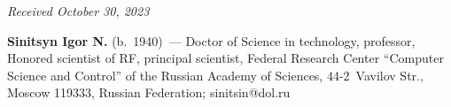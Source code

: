 \vspace*{-6pt}

\hfill{\small\textit{Received October 30, 2023}} 

\vspace*{-18pt}

\Contrl

\vspace*{-3pt}

\noindent 
\textbf{Sinitsyn Igor N.} (b.\ 1940)~--- 
Doctor of Science in technology, professor, Honored scientist of RF, principal scientist, Federal Research Center ``Computer Science and Control''
 of the Russian Academy of Sciences, 44-2~Vavilov Str., Moscow 119333, Russian Federation; \mbox{sinitsin@dol.ru}


\label{end\stat}

\renewcommand{\bibname}{\protect\rm Литература} 